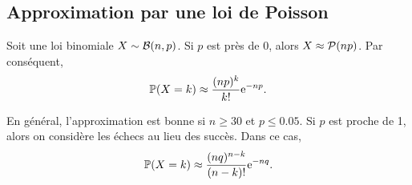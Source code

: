 \documentclass[11pt]{article}
\renewcommand\P{%
	\ensuremath{%
		\mathbb{P}%
	}%
}%
\newcommand\e{%
	\ensuremath{%
		\mathrm{e}%
	}%
}%
\newcommand\bin{%
	\ensuremath{%
		\mathcal{B}%
	}%
}%
\newcommand\poi{%
	\ensuremath{%
		\mathcal{P}%
	}%
}%
\begin{document}
\subsection{Approximation par une loi de Poisson}
Soit une loi binomiale $X\sim\bin(n,p)$. Si $p$ est près de $0$, alors
$X\approx\poi(np)$. Par conséquent,
\begin{equation*}
	\P(X=k)\approx\frac{(np)^k}{k!}\e^{-np}.
\end{equation*}

En général, l'approximation est bonne si $n\geq 30$ et $p\leq 0.05$. Si $p$
est proche de 1, alors on considère les échecs au lieu des succès. Dans ce cas,
\begin{equation*}
	\P(X=k)\approx\frac{(nq)^{n-k}}{(n-k)!}\e^{-nq}.
\end{equation*}
\end{document}
